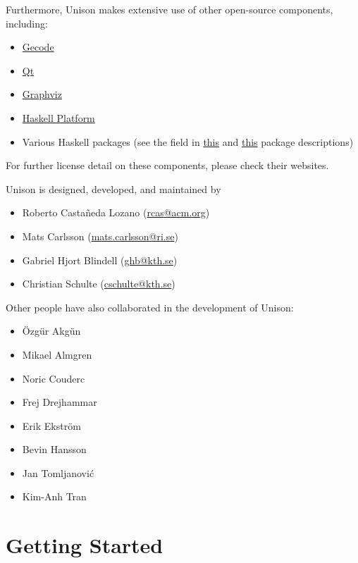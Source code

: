 \documentclass[11pt]{report}
\begin{document}
Furthermore, Unison makes extensive use of other open-source components,
including:

\begin{itemize}
\item \href{http://www.gecode.org/}{Gecode}
\item \href{https://www.qt.io/}{Qt}
\item \href{http://www.graphviz.org/}{Graphviz}
\item \href{https://www.haskell.org/platform/}{Haskell Platform}
\item Various Haskell packages (see the  field in
  \href{https://github.com/unison-code/unison/blob/master/src/unison/unison.cabal}{this}
  and
  \href{https://github.com/unison-code/unison/blob/master/src/unison-specsgen/unison-specsgen.cabal}{this}
  package descriptions)
\end{itemize}

For further license detail on these components, please check their websites.

Unison is designed, developed, and maintained by

\begin{itemize}
\item Roberto Castañeda Lozano (\href{mailto:rcas@acm.org}{rcas@acm.org})
\item Mats Carlsson (\href{mailto:mats.carlsson@ri.se}{mats.carlsson@ri.se})
\item Gabriel Hjort Blindell (\href{mailto:ghb@kth.se}{ghb@kth.se})
\item Christian Schulte (\href{mailto:cschulte@kth.se}{cschulte@kth.se})
\end{itemize}

Other people have also collaborated in the development of Unison:
%
\begin{itemize}
\item Özgür Akgün
\item Mikael Almgren
\item Noric Couderc
\item Frej Drejhammar
\item Erik Ekström
\item Bevin Hansson
\item Jan Tomljanović
\item Kim-Anh Tran
\end{itemize}

\chapter{Getting Started}%
\label{sec:getting-started}
\end{document}

